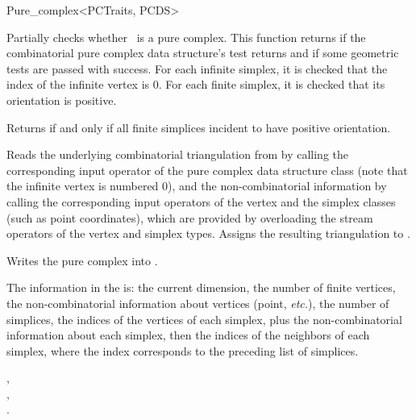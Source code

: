 \begin{ccRefClass}{Pure_complex<PCTraits, PCDS>}

{Partially checks whether \ccVar\ is a pure complex. This function returns
 if the combinatorial pure complex data structure's 
test returns  and if some geometric tests are passed with success.
For each infinite simplex, it is checked that the index of the infinite vertex
is 0. For each finite simplex, it is checked that its orientation is
positive.}

 {Returns  if and only if all
finite simplices incident to  have positive orientation.}


{Reads the underlying combinatorial triangulation from  by
calling the corresponding input operator of the pure complex data
structure class (note that the infinite vertex is numbered 0), and the
non-combinatorial information by calling the corresponding input
operators of the vertex and the simplex classes (such as point
coordinates), which are provided by overloading the stream operators
of the vertex and simplex types. Assigns the resulting triangulation to
.}

{Writes the pure complex  into .}

The information in the  is: the current dimension, the number of
finite vertices, the non-combinatorial information about vertices (point,
\emph{etc.}), the number of simplices, the indices of the vertices of each
simplex, plus the non-combinatorial information about each simplex, then the
indices of the neighbors of each simplex, where the index corresponds to the
preceding list of simplices.

\ccSeeAlso

,\\
,\\
.

\end{ccRefClass}

